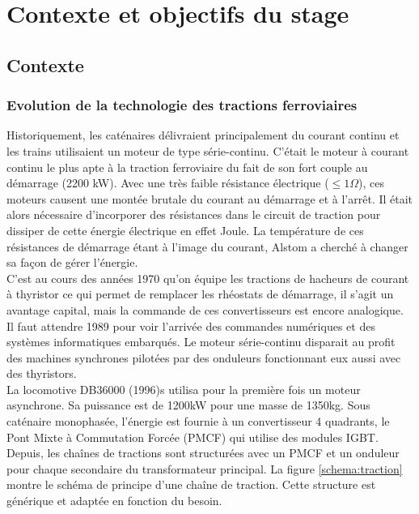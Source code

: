 \documentclass[a4paper]{report}
\begin{document}
	\chapter{Contexte et objectifs du stage}

	
	\section{Contexte}
\subsection{Evolution de la technologie des tractions ferroviaires}
	Historiquement, les caténaires délivraient principalement du courant continu et les trains utilisaient un moteur de type série-continu. C’était le moteur à courant continu le plus apte à la traction ferroviaire du fait de son fort couple au démarrage (2200 kW). Avec une très faible résistance électrique ($\leq 1\Omega$), ces moteurs causent une montée brutale du courant au démarrage et à l'arrêt. Il était alors nécessaire d'incorporer des résistances dans le circuit de traction pour dissiper de cette énergie électrique en effet Joule. La température de ces résistances de démarrage étant à l'image du courant, Alstom a cherché à changer sa façon de gérer l'énergie.\\
	
	C'est au cours des années 1970 qu'on équipe les tractions de hacheurs de courant à thyristor ce qui permet de remplacer les rhéostats de démarrage, il s'agit un avantage capital, mais la commande de ces convertisseurs est encore analogique. Il faut attendre 1989 pour voir l'arrivée des commandes numériques et des systèmes informatiques embarqués. Le moteur série-continu disparait au profit des machines synchrones pilotées par des onduleurs fonctionnant eux aussi avec des thyristors.\\
	
	La locomotive DB36000 (1996)s utilisa pour la première fois un moteur asynchrone. Sa puissance est de 1200kW pour une masse de 1350kg. Sous caténaire monophasée, l'énergie est fournie à un convertisseur 4 quadrants, le Pont Mixte à Commutation Forcée (PMCF) qui utilise des modules IGBT.\\
	
	Depuis, les chaînes de tractions sont structurées avec un PMCF et un onduleur pour chaque secondaire du transformateur principal. La figure \ref{schema:traction} montre le schéma de principe d'une chaîne de traction. Cette structure est générique et adaptée en fonction du besoin.\\
\end{document}
